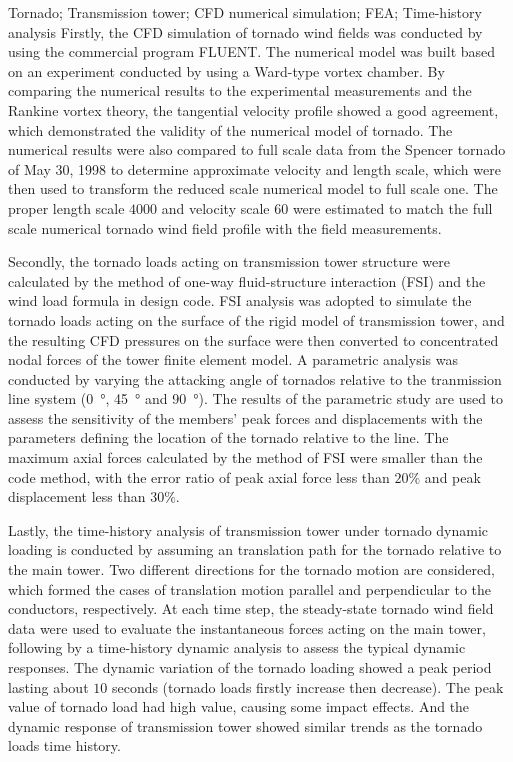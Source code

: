 \begin{englishabstract}{Tornado; Transmission tower; CFD numerical simulation; FEA; Time-history analysis }
  Firstly, the CFD simulation of tornado wind fields was conducted by using the commercial program FLUENT.
  The numerical model was built based on an experiment conducted by using a Ward-type vortex chamber.
  By comparing the numerical results to the experimental measurements and the Rankine vortex theory, the tangential velocity profile showed a good agreement, which demonstrated the validity of the numerical model of tornado.
  The numerical results were also compared to full scale data from the Spencer tornado of May 30, 1998 to determine approximate velocity and length scale, which were then used to transform the reduced scale numerical model to full scale one.
  The proper length scale $4000$ and velocity scale $60$ were estimated to match the full scale numerical tornado wind field profile with the field measurements.

  Secondly, the tornado loads acting on transmission tower structure were calculated by the method of one-way fluid-structure interaction (FSI) and the wind load formula in design code.
  FSI analysis was adopted to simulate the tornado loads acting on the surface of the rigid model of transmission tower, and the resulting CFD pressures on the surface were then converted to concentrated nodal forces of the tower finite element model.
  A parametric analysis was conducted by varying the attacking angle of tornados relative to the tranmission line system (\SI{0}{\degree}, \SI{45}{\degree} and \SI{90}{\degree}).
  The results of the parametric study are used to assess the sensitivity of the members' peak forces and displacements with the parameters defining the location of the tornado relative to the line.
  The maximum axial forces calculated by the method of FSI were smaller than the code method, with the error ratio of peak axial force less than $20\%$ and peak displacement less than $30\%$.

  Lastly, the time-history analysis of transmission tower under tornado dynamic loading is conducted by assuming an translation path for the tornado relative to the main tower.
  Two different directions for the tornado motion are considered, which formed the cases of translation motion parallel and perpendicular to the conductors, respectively.
  At each time step, the steady-state tornado wind field data were used to evaluate the instantaneous forces acting on the main tower, following by a time-history dynamic analysis to assess the typical dynamic responses.
  The dynamic variation of the tornado loading showed a peak period lasting about $10$ seconds (tornado loads firstly increase then decrease).
  The peak value of tornado load had high value, causing some impact effects.
  And the dynamic response of transmission tower showed similar trends as the tornado loads time history.
  
\end{englishabstract}

